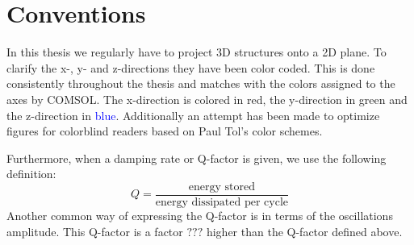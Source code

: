 \chapter*{Conventions}
\label{chap:conventions}
In this thesis we regularly have to project 3D structures onto a 2D plane. To clarify the x-, y- and z-directions they have been color coded. This is done consistently throughout the thesis and matches with the colors assigned to the axes by COMSOL. The x-direction is colored in \textcolor{x_axis_color}{red}, the y-direction in \textcolor{y_axis_color}{green} and the z-direction in \textcolor{blue}{blue}. Additionally an attempt has been made to optimize figures for colorblind readers based on Paul Tol's color schemes\cite{paul_tol}.

Furthermore, when a damping rate or Q-factor is given, we use the following definition:
\begin{equation*}
    Q = \frac{\text{energy stored}}{\text{energy dissipated per cycle}}
\end{equation*}
Another common way of expressing the Q-factor is in terms of the oscillations amplitude. This Q-factor is a factor $???$ higher than the Q-factor defined above.

